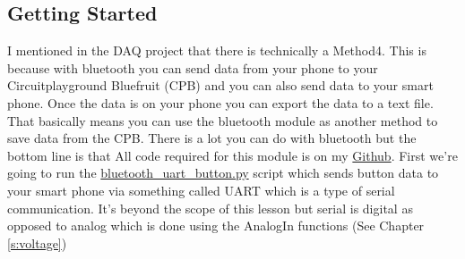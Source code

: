 

\subsection{Getting Started}

I mentioned in the DAQ project that there is technically a
Method4. This is because with bluetooth you can send data from your
phone to your Circuitplayground Bluefruit
(CPB) and you can also send data to your smart phone. Once
the data is on your phone you can export the data to a text file. That
basically means you can use the bluetooth module as another method to
save data from the CPB. There is a lot you can do 
with bluetooth but the bottom line is that  All
code required for this module is on
my \href{https://github.com/cmontalvo251/Microcontrollers/tree/master/Circuit_Playground/CircuitPython/CPB_DataLogger}{Github}. First we're going to run
the \href{https://github.com/cmontalvo251/Microcontrollers/blob/master/Circuit_Playground/CircuitPython/CPB_DataLogger/bluefruit_uart_button.py}{bluetooth\_uart\_button.py}
script which sends button data to your smart phone via something called UART
which is a type of serial communication. It's beyond the scope of this
lesson but serial is digital as opposed to analog which is done using the AnalogIn functions (See Chapter \ref{s:voltage})

